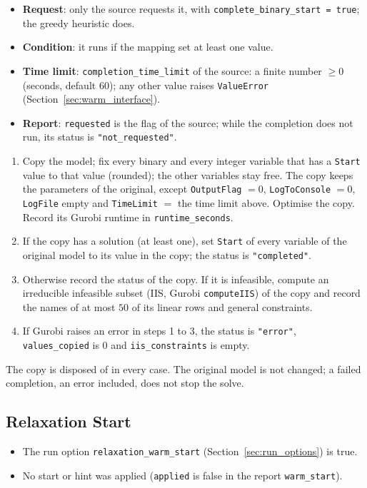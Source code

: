 \begin{itemize}[nosep,leftmargin=1.5em]
  \item \textbf{Request}: only the source requests it, with \texttt{complete\_binary\_start = true}; the greedy heuristic does.
  \item \textbf{Condition}: it runs if the mapping set at least one value.
  \item \textbf{Time limit}: \texttt{completion\_time\_limit} of the source: a finite number $\ge 0$ (seconds, default $60$); any other value raises \texttt{ValueError} (Section~\ref{sec:warm_interface}).
  \item \textbf{Report}: \texttt{requested} is the flag of the source; while the completion does not run, its status is \texttt{"not\_requested"}.
\end{itemize}
\begin{enumerate}[nosep,label=\arabic*.]
  \item Copy the model; fix every binary and every integer variable that has a \texttt{Start} value to that value (rounded); the other variables stay free. The copy keeps the parameters of the original, except \texttt{OutputFlag} $= 0$, \texttt{LogToConsole} $= 0$, \texttt{LogFile} empty and \texttt{TimeLimit} $=$ the time limit above. Optimise the copy. Record its Gurobi runtime in \texttt{runtime\_seconds}.
  \item If the copy has a solution (at least one), set \texttt{Start} of every variable of the original model to its value in the copy; the status is \texttt{"completed"}.
  \item Otherwise record the status of the copy. If it is infeasible, compute an irreducible infeasible subset (IIS, Gurobi \texttt{computeIIS}) of the copy and record the names of at most $50$ of its linear rows and general constraints.
  \item If Gurobi raises an error in steps 1 to 3, the status is \texttt{"error"}, \texttt{values\_copied} is $0$ and \texttt{iis\_constraints} is empty.
\end{enumerate}
The copy is disposed of in every case. The original model is not changed; a failed completion, an error included, does not stop the solve.

\subsection{Relaxation Start}
\label{sec:warm_relaxation}

\begin{itemize}[nosep,leftmargin=1.5em]
  \item The run option \texttt{relaxation\_warm\_start} (Section~\ref{sec:run_options}) is true.
  \item No start or hint was applied (\texttt{applied} is false in the report \texttt{warm\_start}).
\end{itemize}

